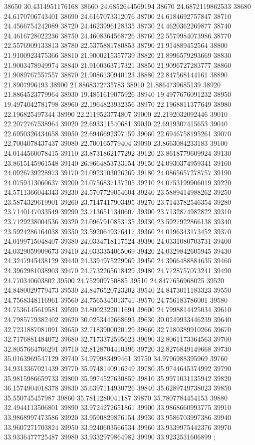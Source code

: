 {38650 30.4314951176168
38660 24.6852644569194
38670 24.6872119862533
38680 24.6170706743401
38690 24.6167073312076
38700 24.6184692757847
38710 24.4566754242089
38720 24.4623996128335
38730 24.4620362269877
38740 24.4616728022236
38750 24.4608364568726
38760 22.5579984073986
38770 22.5576909133813
38780 22.5375881780853
38790 21.914889452564
38800 21.9100923475366
38810 21.9000215357739
38820 21.8996579293669
38830 21.9003478949974
38840 21.9100363717321
38850 21.9096727283777
38860 21.9089767557557
38870 21.9086130940123
38880 22.847568144161
38890 21.8907996193
38900 21.8868372735783
38910 21.8864739685139
38920 21.8864523779964
38930 19.4851619075926
38940 19.4977676091232
38950 19.4974042781798
38960 22.1964823932356
38970 22.1968811377649
38980 22.196825497344
38990 22.2119523774807
39000 22.2192032092446
39010 22.2072767538964
39020 22.693311540681
39030 22.6919307415653
39040 22.6950326434658
39050 22.6946692397159
39060 22.6946758195261
39070 22.7004078437437
39080 22.700165779404
39090 23.8663084233183
39100 24.0144560078415
39110 23.8731862177292
39120 23.8618779609924
39130 23.8615145961548
39140 26.9664853733154
39150 24.0930374959341
39160 24.0926739228973
39170 24.0923103026269
39180 24.0865657278757
39190 24.0759413060637
39200 24.0756837137205
39210 24.0753199906019
39220 24.5711366044343
39230 24.5707729054604
39240 23.5889414988262
39250 23.5874329619901
39260 23.7147417903495
39270 23.7143782546354
39280 23.7140147033549
39290 23.7136511340607
39300 23.7132874982822
39310 23.7129238004536
39320 24.0967910853135
39330 23.5927922866138
39340 23.5924286164038
39350 23.5920649376417
39360 24.0196343173452
39370 24.0199715048407
39380 24.0334718117524
39390 24.0331080703731
39400 24.0329059909673
39410 24.0333354065069
39420 24.0329842605945
39430 24.3247945438129
39440 24.3394975229969
39450 24.3966488884635
39460 24.3962981038903
39470 24.7732265618429
39480 24.7728757073241
39490 24.770340603802
39500 24.752909750885
39510 24.8477656968025
39520 24.8480029779473
39530 24.8476520723202
39540 24.8473011183323
39550 24.7568348116961
39560 24.7565345013741
39570 24.756183786001
39580 24.7536145619581
39590 24.8002322011694
39600 24.7998814425034
39610 24.7985779382402
39620 30.0253442668693
39630 30.0249933446239
39640 32.7231887081091
39650 32.7183900020129
39660 32.7180389910266
39670 32.7176881484072
39680 32.7173372595623
39690 32.8061173364563
39700 32.8057664766291
39710 32.8128704410396
39720 32.8276849149668
39730 35.0163969547129
39740 34.979983499461
39750 34.9796988395969
39760 34.9313367021439
39770 35.9748140916249
39780 35.9744645374992
39790 35.9815986659733
39800 35.9974527630859
39810 35.9971031135942
39820 36.1574904018378
39830 35.6397114930726
39840 35.6289749738023
39850 35.550745457987
39860 35.7811280041187
39870 35.7807784454153
39880 32.4944113506801
39890 33.9724272651861
39900 33.9868660993775
39910 33.9868997473586
39920 33.9590829876154
39930 33.9586703997386
39940 33.9607271703824
39950 33.9240603566534
39960 33.9339975442376
39970 33.9336477725487
39980 33.9332979864982
39990 33.9232531606899
};
